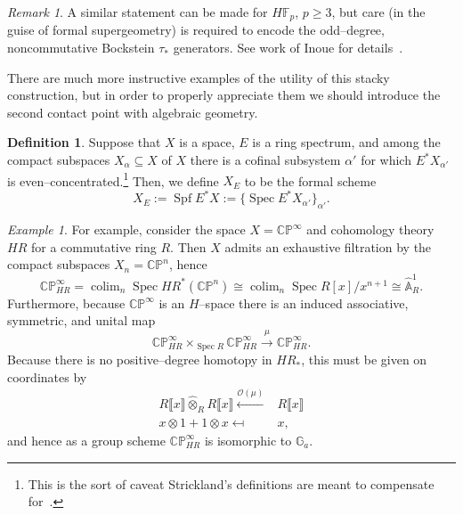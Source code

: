 \documentclass{amsart}
\newcommand{\F}{\mathbb F}
\newcommand{\G}{\mathbb G}
\newcommand{\C}{\mathbb{C}}
\newcommand{\CP}{\C\P}
\newcommand{\A}{\widehat{\mathbb{A}}}
\renewcommand{\P}{\mathbb{P}}
\newcommand{\<}{\langle}
\renewcommand{\>}{\rangle}
\newcommand{\sheaf}[1]{\mathcal{#1}}
\DeclareMathOperator{\Spec}{Spec}
\DeclareMathOperator{\Spf}{Spf}
\DeclareMathOperator{\colim}{colim}
\theoremstyle{plain}
\theoremstyle{definition}
\newtheorem*{definition}{Definition}
\theoremstyle{remark}
\newtheorem*{remark}{Remark}
\newtheorem*{example}{Example}
\begin{document}
\begin{remark}\label{InoueRemark}
A similar statement can be made for $H\F_p$, $p \ge 3$, but care (in the guise of formal supergeometry) is required to encode the odd--degree, noncommutative Bockstein $\tau_*$ generators.  See work of Inoue for details~\cite{Inoue}.
\end{remark}

There are much more instructive examples of the utility of this stacky construction, but in order to properly appreciate them we should introduce the second contact point with algebraic geometry.

\begin{definition}
Suppose that $X$ is a space, $E$ is a ring spectrum, and among the compact subspaces $X_\alpha \subseteq X$ of $X$ there is a cofinal subsystem $\alpha'$ for which $E^* X_{\alpha'}$ is even--concentrated.\footnote{This is the sort of caveat Strickland's definitions are meant to compensate for~\cite[Definition 8.15]{StricklandFSFG}.}  Then, we define $X_E$ to be the formal scheme \[X_E := \Spf E^* X := \{\Spec E^* X_{\alpha'}\}_{\alpha'}.\]
\end{definition}

\begin{example}
For example, consider the space $X = \CP^\infty$ and cohomology theory $HR$ for a commutative ring $R$.  Then $X$ admits an exhaustive filtration by the compact subspaces $X_n = \CP^n$, hence \[\CP^\infty_{HR} = \colim_n \Spec HR^*(\CP^n) \cong \colim_n \Spec R[x] / x^{n+1} \cong \A^1_R.\]  Furthermore, because $\CP^\infty$ is an $H$--space there is an induced associative, symmetric, and unital map \[\CP^\infty_{HR} \times_{\Spec R} \CP^\infty_{HR} \xrightarrow{\mu} \CP^\infty_{HR}.\]  Because there is no positive--degree homotopy in $HR_*$, this must be given on coordinates by
\begin{align*}
R\llbracket x \rrbracket \widehat\otimes_R R\llbracket x \rrbracket \xleftarrow{\sheaf{O}(\mu)} & R\llbracket x \rrbracket \\
x \otimes 1 + 1 \otimes x \mapsfrom & x,
\end{align*}
and hence as a group scheme $\CP^\infty_{HR}$ is isomorphic to $\G_a$.
\end{example}
\end{document}
